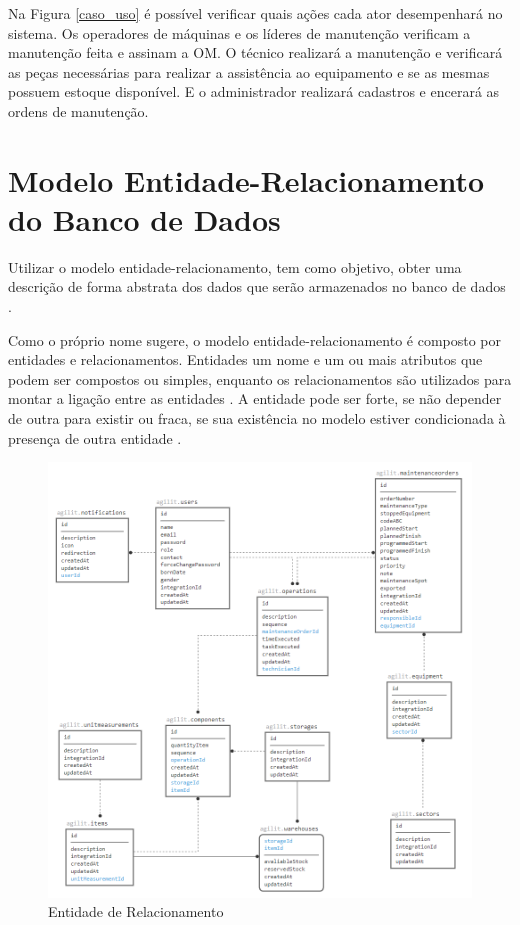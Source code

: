 Na Figura \ref{caso_uso} é possível verificar quais ações cada ator desempenhará no sistema. Os operadores de máquinas e os líderes de manutenção verificam a manutenção feita e assinam a OM. O técnico realizará a manutenção e verificará as peças necessárias para realizar a assistência ao equipamento e se as mesmas possuem estoque disponível. E o administrador realizará cadastros e encerará as ordens de manutenção.

	
\section{Modelo Entidade-Relacionamento do Banco de Dados}

Utilizar o modelo entidade-relacionamento, tem como objetivo, obter uma descrição de forma abstrata dos dados que serão armazenados no banco de dados \cite{2010_erbd}.

Como o próprio nome sugere, o modelo entidade-relacionamento é composto por entidades e relacionamentos. Entidades um nome e um ou mais atributos que podem ser compostos ou simples, enquanto os relacionamentos são utilizados para montar a ligação entre as entidades \cite{noguera2018extensao}. A entidade pode ser forte, se não depender de outra para existir ou fraca, se sua existência no modelo estiver condicionada à presença de outra entidade \cite{dantas2016analise}.

\begin{figure}[H]
	\caption{\label{entidade_relacionamento}Entidade de Relacionamento}
	\begin{center}
		\includegraphics[scale=0.70]{./Figuras/er3.png}
	\end{center}
\end{figure}

